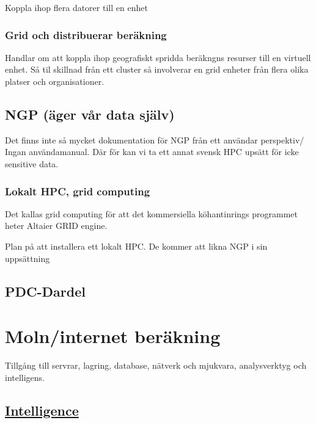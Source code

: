 \documentclass[
  letterpaper,
  DIV=11,
  numbers=noendperiod]{scrreprt}
\begin{document}
Koppla ihop flera datorer till en enhet

\subsubsection{Grid och distribuerar
beräkning}\label{grid-och-distribuerar-beruxe4kning}

Handlar om att koppla ihop geografiskt spridda beräkngns resurser till
en virtuell enhet. Så til skillnad från ett cluster så involverar en
grid enheter från flera olika platser och organisationer.

\subsection{NGP (äger vår data
själv)}\label{ngp-uxe4ger-vuxe5r-data-sjuxe4lv}

Det finns inte så mycket dokumentation för NGP från ett användar
perspektiv/ Ingan användamanual. Där för kan vi ta ett annat svensk HPC
upsätt för icke sensitive data.

\subsubsection{Lokalt HPC, grid
computing}\label{lokalt-hpc-grid-computing}

Det kallas grid computing för att det kommersiella köhantinrings
programmet heter Altaier GRID engine.

Plan på att installera ett lokalt HPC. De kommer att likna NGP i sin
uppsättning

\subsection{PDC-Dardel}\label{pdc-dardel}

\section{Moln/internet beräkning}\label{molninternet-beruxe4kning}

Tillgång till servrar, lagring, database, nätverk och mjukvara,
analysverktyg och intelligens.

\subsection{\texorpdfstring{\href{https://www.researchgate.net/publication/230800624_Cloud_intelligence_what_is_REALLY_new}{Intelligence}}{Intelligence}}\label{intelligence}
\end{document}
